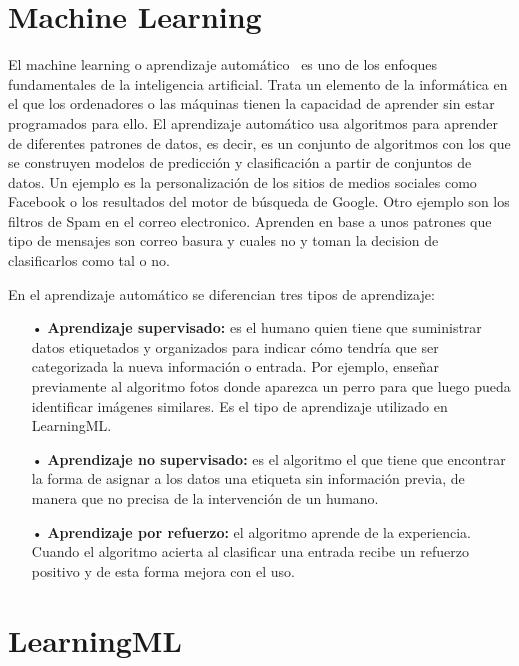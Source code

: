 \documentclass[a4paper, 12pt]{book}
\begin{document}
\section{Machine Learning} 
\label{sec:MachineLearning}
El machine learning o aprendizaje automático~\cite{rouhiainen2018inteligencia}  es uno de los enfoques fundamentales de la inteligencia artificial. 
Trata un elemento de la informática en el que los ordenadores o las máquinas tienen la capacidad de aprender sin estar programados para ello. 
El aprendizaje automático usa algoritmos para aprender de diferentes patrones de datos, es decir, es un conjunto de algoritmos con los que se construyen modelos de predicción y clasificación a partir de conjuntos de datos. 
Un ejemplo es la personalización de los sitios de medios sociales como Facebook o los resultados del motor de
búsqueda de Google. 
Otro ejemplo son  los filtros de Spam en el correo electronico. 
Aprenden en base a unos patrones que tipo de mensajes son correo basura y cuales no y toman la decision de clasificarlos como tal o no.

En el aprendizaje automático se diferencian tres tipos de aprendizaje:

\begin{itemize}

	\item[•] \textbf{Aprendizaje supervisado:} es el humano quien tiene que suministrar datos etiquetados y organizados para indicar cómo tendría que ser categorizada la nueva información o entrada. 
	Por ejemplo, enseñar previamente al algoritmo fotos donde aparezca un perro para que luego pueda identificar imágenes similares. 
	Es el tipo de aprendizaje utilizado en LearningML.
	
	\item[•] \textbf{Aprendizaje no supervisado:} es el algoritmo el que tiene que encontrar la forma de asignar a los datos una etiqueta sin información previa, de manera que no precisa de la intervención de un humano.
	
	\item[•] \textbf{Aprendizaje por refuerzo:} el algoritmo aprende de la experiencia. 
	Cuando el algoritmo acierta al clasificar una entrada recibe un refuerzo positivo y de esta forma mejora con el uso.
	
\end{itemize}

\section{LearningML} 
\label{sec:LearningML}
\end{document}
